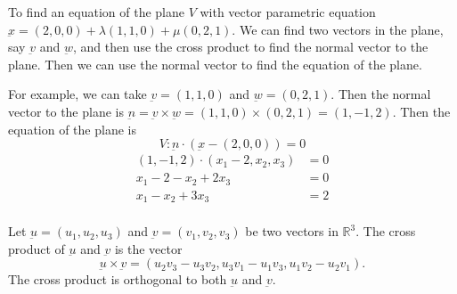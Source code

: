 \documentclass{article}
\theoremstyle{mytheoremstyle}
\theoremstyle{mytheoremstyle}
\theoremstyle{myproblemstyle}
\theoremstyle{myproblemstyle}
\begin{document}
\begin{example}
	To find an equation of the plane $V$ with vector parametric equation
	$\underbar{x} = (2,0,0) + \lambda(1,1,0) + \mu(0,2,1)$. We can find
	two vectors in the plane, say $\underbar{v}$ and $\underbar{w}$, and then
	use the cross product to find the normal vector to the plane. Then we can
	use the normal vector to find the equation of the plane.

	For example, we can take $\underbar{v} = (1,1,0)$ and $\underbar{w} = (0,2,1)$.
	Then the normal vector to the plane is $\underbar{n} = \underbar{v} \times \underbar{w} = (1,1,0) \times (0,2,1) = (1,-1,2)$.
	Then the equation of the plane is
	$$V: \underbar{n} \cdot (\underbar{x} - (2,0,0)) = 0$$
	\begin{align*}
		(1,-1,2) \cdot (x_1-2,x_2,x_3) & = 0 \\
		x_1-2 -x_2 + 2x_3              & = 0 \\
		x_1-x_2+3x_3                   & = 2 \\
	\end{align*}
\end{example}
\begin{definition}
	Let $\underbar{u} = (u_1,u_2,u_3)$ and $\underbar{v} = (v_1,v_2,v_3)$ be two vectors in $\mathbb{R}^3$. The cross product of $\underbar{u}$ and $\underbar{v}$ is the vector
	$$\underbar{u} \times \underbar{v} = (u_2v_3-u_3v_2,u_3v_1-u_1v_3,u_1v_2-u_2v_1).$$
	The cross product is orthogonal to both $\underbar{u}$ and $\underbar{v}$.
\end{definition}


\end{document}
